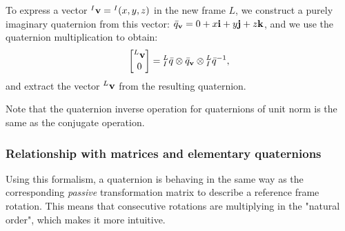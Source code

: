 To express a vector ${}_{}^{I}\textrm{\textbf{v}} = {}_{}^{I}(x,y,z)$ in the new frame $L$, we construct a purely imaginary quaternion from this vector: $\bar{q}_{\textrm{\textbf{v}}} = 0 + x\textrm{\textbf{i}} + y\textrm{\textbf{j}} + z\textrm{\textbf{k}}$, and we use the quaternion multiplication to obtain:
\begin{equation}
\begin{bmatrix} {}_{}^{L}\textrm{\textbf{v}}\\ 0 \end{bmatrix}= {}_{I}^{L}\bar{q}\otimes\bar{q}_{\textrm{\textbf{v}}}\otimes{}_{I}^{L}\bar{q}^{-1},
\end{equation} 
and extract the vector ${}_{}^{L}\textrm{\textbf{v}}$ from the resulting quaternion.

Note that the quaternion inverse operation for quaternions of unit norm is the same as the conjugate operation. 

\subsubsection{Relationship with matrices and elementary quaternions}
Using this formalism, a quaternion is behaving in the same way as the corresponding \textit{passive} transformation matrix to describe a reference frame rotation. This means that consecutive rotations are multiplying in the "natural order", which makes it more intuitive.

